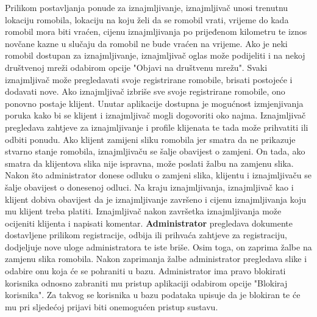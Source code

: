 		Prilikom postavljanja ponude za iznajmljivanje, iznajmljivač unosi trenutnu lokaciju romobila, lokaciju na koju želi da se romobil vrati, vrijeme do kada romobil mora biti vraćen, cijenu iznajmljivanja po prijeđenom kilometru te iznos novčane kazne u slučaju da romobil ne bude vraćen na vrijeme. Ako je neki romobil dostupan za iznajmljivanje, iznajmljivač oglas može podijeliti i na nekoj društvenoj mreži odabirom opcije "Objavi na društvenu mrežu". Svaki iznajmljivač može pregledavati svoje registrirane romobile, brisati postojeće i dodavati nove. Ako iznajmljivač izbriše sve svoje registrirane romobile, ono ponovno postaje klijent. Unutar aplikacije dostupna je mogućnost izmjenjivanja poruka kako bi se klijent i iznajmljivač mogli dogovoriti oko najma. Iznajmljivač pregledava zahtjeve za iznajmljivanje i profile klijenata te tada može prihvatiti ili odbiti ponudu. Ako klijent zamijeni sliku romobila jer smatra da ne prikazuje stvarno stanje romobila, iznajmljivaču se šalje obavijest o zamjeni. On tada, ako smatra da klijentova slika nije ispravna, može poslati žalbu na zamjenu slika. Nakon što administrator donese odluku o zamjeni slika, klijentu i iznajmljivaču se šalje obavijest o donesenoj odluci. Na kraju iznajmljivanja, iznajmljivač kao i klijent dobiva obavijest da je iznajmljivanje završeno i cijenu iznajmljivanja koju mu klijent treba platiti. Iznajmljivač nakon završetka iznajmljivanja može ocijeniti klijenta i napisati komentar. \textbf{Administrator} pregledava dokumente dostavljene prilikom registracije, odbija ili prihvaća zahtjeve za registraciju, dodjeljuje nove uloge administratora te iste briše. Osim toga, on zaprima žalbe na zamjenu slika romobila. Nakon zaprimanja žalbe administrator pregledava slike i odabire onu koja će se pohraniti u bazu. Administrator ima pravo blokirati korisnika odnosno zabraniti mu pristup aplikaciji odabirom opcije "Blokiraj korisnika". Za takvog se korisnika u bazu podataka upisuje da je blokiran te će mu pri sljedećoj prijavi biti onemogućen pristup sustavu.
		\newline
		\newline

